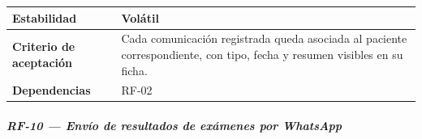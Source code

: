 \documentclass[
]{article}
\begin{document}
{\begin{longtable}[]{|
  >{\raggedright\arraybackslash}p{}|
  >{\raggedright\arraybackslash}p{}|}
\textbf{Estabilidad} & \begin{minipage}[t]{\linewidth}\raggedright
Volátil
\end{minipage} \\
\hline
\textbf{Criterio de aceptación} &
\begin{minipage}[t]{\linewidth}\raggedright
Cada comunicación registrada queda asociada al paciente correspondiente, con tipo, fecha y resumen visibles en su ficha.
\end{minipage} \\
\hline
\textbf{Dependencias} & \begin{minipage}[t]{\linewidth}\raggedright
RF-02
\end{minipage} \\
\hline
\end{longtable}
}

\subparagraph{RF-10 --- Envío de resultados de exámenes por WhatsApp}\label{rf-10-env-o-de-resultados-de-ex-menes-por-what}
\end{document}
